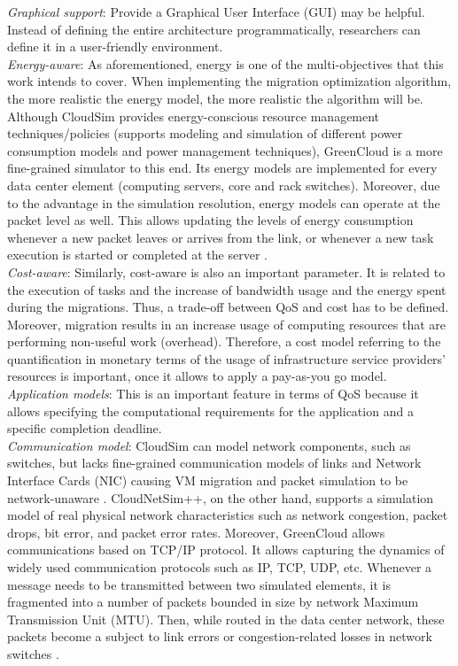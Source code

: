 \textit{Graphical support}: Provide a Graphical User Interface (GUI) may be helpful. Instead of defining the entire architecture programmatically, researchers can define it in a user-friendly environment.\\[6pt]
\textit{Energy-aware}: As aforementioned, energy is one of the multi-objectives that this work intends to cover. When implementing the migration optimization algorithm, the more realistic the energy model, the more realistic the algorithm will be. Although CloudSim provides energy-conscious resource management techniques/policies (supports modeling and simulation of different power consumption models and power management techniques), GreenCloud is a more fine-grained simulator to this end. Its energy models are implemented for every data center element (computing servers, core and rack switches). Moreover, due to the advantage in the simulation resolution, energy models can operate at the packet level as well. This allows updating the levels of energy consumption whenever a new packet leaves or arrives from the link, or whenever a new task execution is started or completed at the server \cite{kliazovich2012greencloud}.\\[6pt]
\textit{Cost-aware}: Similarly, cost-aware is also an important parameter. It is related to the execution of tasks and the increase of bandwidth usage and the energy spent during the migrations. Thus, a trade-off between QoS and cost has to be defined. Moreover, migration results in an increase usage of computing resources that are performing non-useful work (overhead). Therefore, a cost model referring to the quantification in monetary terms of the usage of infrastructure service providers' resources is important, once it allows to apply a pay-as-you go model.\\[6pt]
\textit{Application models}: This is an important feature in terms of QoS because it allows specifying the computational requirements for the application and a specific completion deadline.\\[6pt]
\textit{Communication model}: CloudSim can model network components, such as switches, but lacks fine-grained communication models of links and Network Interface Cards (NIC) causing VM migration and packet simulation to be network-unaware \cite{malik2017cloudnetsim++}. CloudNetSim++, on the other hand, supports a simulation model of real physical network characteristics such as network congestion, packet drops, bit error, and packet error rates. Moreover, GreenCloud allows communications based on TCP/IP protocol. It allows capturing the dynamics of widely used communication protocols such as IP, TCP, UDP, etc. Whenever a message needs to be transmitted between two simulated elements, it is fragmented into a number of packets bounded in size by network Maximum Transmission Unit (MTU). Then, while routed in the data center network, these packets become a subject to link errors or congestion-related losses in network switches \cite{kliazovich2012greencloud}.\\[6pt]
